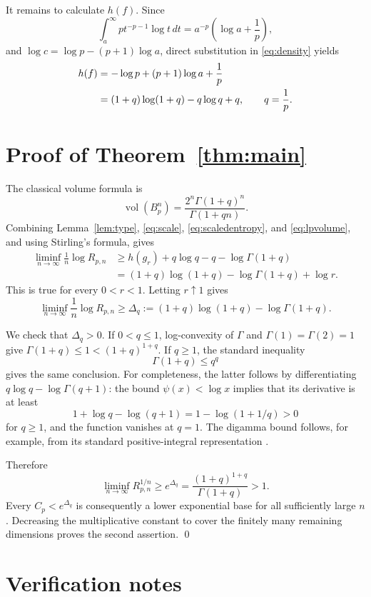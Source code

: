 \documentclass[11pt]{article}
\newcommand{\vol}{\operatorname{vol}}
\newcommand{\1}{\mathbf 1}
\begin{document}
It remains to calculate \(h(f)\).  Since
\[
 \int_a^\infty pt^{-p-1}\log t\,dt
 =a^{-p}\left(\log a+\frac1p\right),
\]
and \(\log c=\log p-(p+1)\log a\), direct substitution in
\eqref{eq:density} yields
\begin{align}
 h(f)
 &=-\log p+(p+1)\log a+\frac1p \notag\\
 &=(1+q)\log(1+q)-q\log q+q,
 \qquad q=\frac1p.
\label{eq:entropy}
\end{align}

\section{Proof of Theorem~\ref{thm:main}}

The classical volume formula is
\begin{equation}\label{eq:lpvolume}
 \vol(B_p^n)
 =\frac{2^n\Gamma(1+q)^n}{\Gamma(1+qn)}.
\end{equation}
Combining Lemma~\ref{lem:type}, \eqref{eq:scale},
\eqref{eq:scaledentropy}, and \eqref{eq:lpvolume}, and using Stirling's
formula, gives
\begin{align*}
 \liminf_{n\to\infty}\frac1n\log R_{p,n}
 &\geq h(g_r)+q\log q-q-\log\Gamma(1+q)\\
 &= (1+q)\log(1+q)-\log\Gamma(1+q)+\log r.
\end{align*}
This is true for every \(0<r<1\).  Letting \(r\uparrow1\) gives
\[
 \liminf_{n\to\infty}\frac1n\log R_{p,n}
 \geq
 \Delta_q:=(1+q)\log(1+q)-\log\Gamma(1+q).
\]

We check that \(\Delta_q>0\).  If \(0<q\leq1\), log-convexity of
\(\Gamma\) and \(\Gamma(1)=\Gamma(2)=1\) give
\(\Gamma(1+q)\leq1<(1+q)^{1+q}\).  If \(q\geq1\), the standard
inequality
\[
 \Gamma(1+q)\leq q^q
\]
gives the same conclusion.  For completeness, the latter follows by
differentiating
\(q\log q-\log\Gamma(q+1)\): the bound
\(\psi(x)<\log x\) implies that its derivative is at least
\[
 1+\log q-\log(q+1)
 =1-\log(1+1/q)>0
\]
for \(q\geq1\), and the function vanishes at \(q=1\).
The digamma bound follows, for example, from its standard positive-integral
representation \cite[Chapter 6]{AS}.

Therefore
\[
 \liminf_{n\to\infty}R_{p,n}^{1/n}
 \geq e^{\Delta_q}
 =\frac{(1+q)^{1+q}}{\Gamma(1+q)}
 >1.
\]
Every \(C_p<e^{\Delta_q}\) is consequently a lower exponential base for
all sufficiently large \(n\).  Decreasing the multiplicative constant
to cover the finitely many remaining dimensions proves the second
assertion.
\qed

\section{Verification notes}
\end{document}
